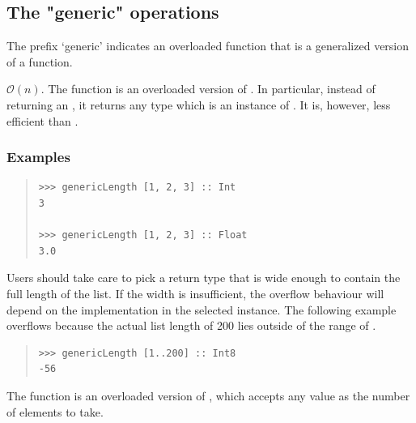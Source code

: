 \subsection{The "generic" operations}
The prefix ‘generic’ indicates an overloaded function that is a
 generalized version of a  function.\par
\begin{haddockdesc}
\item[\begin{tabular}{@{}l}
genericLength :: Num i => {\char 91}a{\char 93} -> i
\end{tabular}]
{\haddockbegindoc
\(\mathcal{O}(n)\). The  function is an overloaded version
 of . In particular, instead of returning an , it returns any
 type which is an instance of . It is, however, less efficient than
 .\par
\subsubsection*{\textbf{Examples}}
\begin{quote}
{\haddockverb\begin{verbatim}
>>> genericLength [1, 2, 3] :: Int
3

>>> genericLength [1, 2, 3] :: Float
3.0

\end{verbatim}}
\end{quote}
Users should take care to pick a return type that is wide enough to contain
 the full length of the list. If the width is insufficient, the overflow
 behaviour will depend on the \haddocktt{(+)} implementation in the selected 
 instance. The following example overflows because the actual list length
 of 200 lies outside of the  range of .\par
\begin{quote}
{\haddockverb\begin{verbatim}
>>> genericLength [1..200] :: Int8
-56

\end{verbatim}}
\end{quote}}
\end{haddockdesc}
\begin{haddockdesc}
\item[\begin{tabular}{@{}l}
genericTake :: Integral i => i -> {\char 91}a{\char 93} -> {\char 91}a{\char 93}
\end{tabular}]
{\haddockbegindoc
The  function is an overloaded version of , which
 accepts any  value as the number of elements to take.\par}
\end{haddockdesc}
